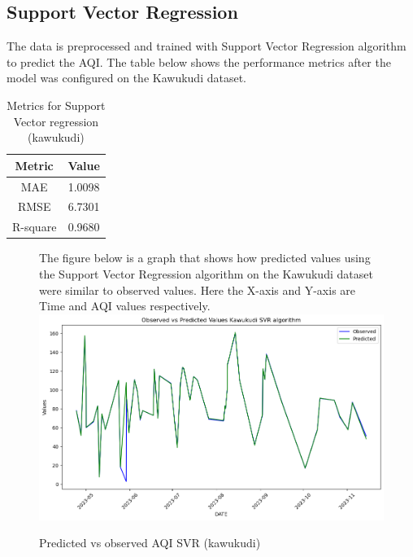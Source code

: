 \documentclass{book}
\numberwithin{equation}{section}
\numberwithin{figure}{section}
\begin{document}
\subsection{Support Vector Regression}
The data is preprocessed and trained with Support Vector Regression algorithm to predict the AQI. The table below shows the performance metrics after the model was configured on the Kawukudi dataset.\\
\begin{table}[H]
    \centering
    \begin{tabular}{|c|c|}
        \hline
        \textbf{Metric} & \textbf{Value} \\
        \hline
        MAE & 1.0098 \\
        \hline
        RMSE & 6.7301 \\
        \hline
        R-square & 0.9680 \\
        \hline
    \end{tabular}
    \caption{Metrics for Support Vector regression (kawukudi)}
    \label{tab: SVR metrics(Kawukudi)}
\end{table}
\begin{figure}[H]
 \begin{minipage}{\linewidth}
        The figure below is a graph that shows how predicted values using the Support Vector Regression algorithm on the Kawukudi dataset were similar to observed values. Here the X-axis and Y-axis are Time and AQI values respectively.
        \vspace{0.5em} 
        \includegraphics[width=\linewidth]{kawukudi svr.png}
       
        \caption{ Predicted vs observed AQI SVR (kawukudi)}
        \label{fig: SVR predicted vs observed AQI(Kawukudi)}
    \end{minipage}
\end{figure}
\end{document}
